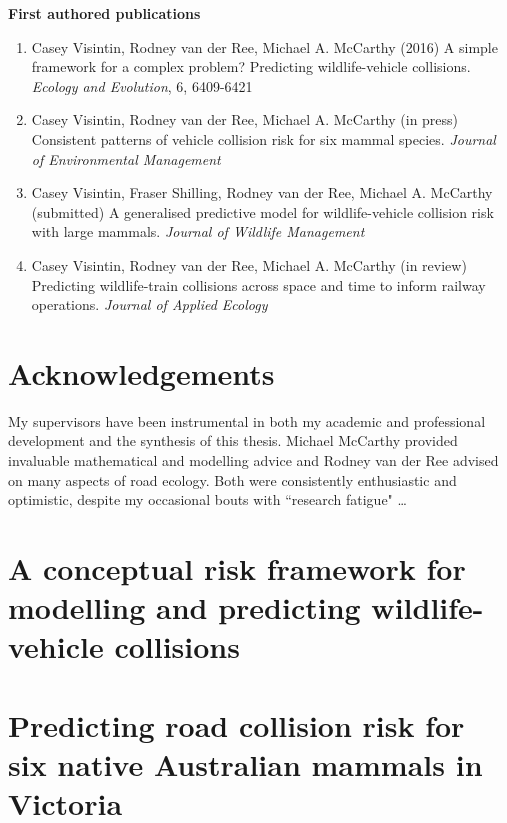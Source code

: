 \documentclass[titlesmallcaps,copyrightpage,examinerscopy]{uomthesis}
\begin{document}
\newpage
\textbf{First authored publications}
\begin{enumerate}
\item Casey Visintin, Rodney van der Ree, Michael A. McCarthy (2016) A simple framework for a complex problem?  Predicting wildlife-vehicle collisions. \textit{Ecology and Evolution}, 6, 6409-6421

\item Casey Visintin, Rodney van der Ree, Michael A. McCarthy (in press) Consistent patterns of vehicle collision risk for six mammal species. \textit{Journal of Environmental Management}

\item Casey Visintin, Fraser Shilling, Rodney van der Ree, Michael A. McCarthy (submitted) A generalised predictive model for wildlife-vehicle collision risk with large mammals. \textit{Journal of Wildlife Management}

\item Casey Visintin, Rodney van der Ree, Michael A. McCarthy (in review) Predicting wildlife-train collisions across space and time to inform railway operations. \textit{Journal of Applied Ecology}
\end{enumerate}

\chapter{Acknowledgements}

My supervisors have been instrumental in both my academic and professional development and the synthesis of this thesis.  Michael McCarthy provided invaluable mathematical and modelling advice and Rodney van der Ree advised on many aspects of road ecology.  Both were consistently enthusiastic and optimistic, despite my occasional bouts with ``research fatigue" \ldots

\tableofcontents
\listoffigures
\listoftables

\mainmatter



%
\chapter{A conceptual risk framework for modelling and predicting wildlife-vehicle collisions}\label{sec:egk}


%
\chapter{Predicting road collision risk for six native Australian mammals in Victoria}\label{sec:6sp}
\end{document}
